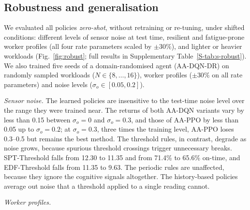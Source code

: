 \subsection{Robustness and generalisation}\label{sec:robust}
We evaluated all policies \emph{zero-shot}, without retraining or re-tuning, under shifted conditions: different levels of sensor noise at test time, resilient and fatigue-prone worker profiles (all four rate parameters scaled by $\pm30\%$), and lighter or heavier workloads (Fig.~\ref{fig:robust}; full results in Supplementary Table~\ref{S-tab:s-robust}). We also trained five seeds of a domain-randomised agent (AA-DQN-DR) on randomly sampled workloads ($N\in\{8,\dots,16\}$), worker profiles ($\pm30\%$ on all rate parameters) and noise levels ($\sigma_o\in[0.05,0.2]$).

\emph{Sensor noise.} The learned policies are insensitive to the test-time noise level over the range they were trained near. The returns of both AA-DQN variants vary by less than 0.15 between $\sigma_o=0$ and $\sigma_o=0.3$, and those of AA-PPO by less than 0.05 up to $\sigma_o=0.2$; at $\sigma_o=0.3$, three times the training level, AA-PPO loses 0.3--0.5 but remains the best method. The threshold rules, in contrast, degrade as noise grows, because spurious threshold crossings trigger unnecessary breaks. SPT-Threshold falls from 12.30 to 11.35 and from 71.4\% to 65.6\% on-time, and EDF-Threshold falls from 11.35 to 9.63. The periodic rules are unaffected, because they ignore the cognitive signals altogether. The history-based policies average out noise that a threshold applied to a single reading cannot.

\emph{Worker profiles.} 

